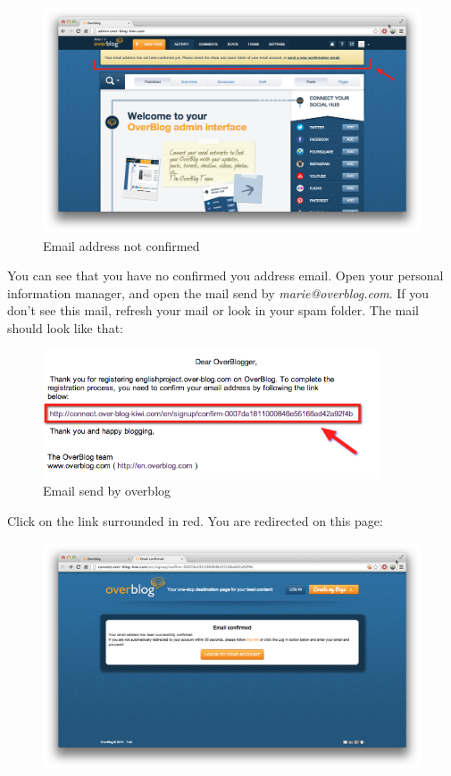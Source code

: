 \documentclass[a4paper,10pt]{article}
\begin{document}
\begin{enumerate}
\begin{figure}[H]
	\includegraphics[width=13cm]{Images/addressMailNotConfirmed.png}
    \caption{Email address not confirmed}
\end{figure}
You can see that you have no confirmed you address email. Open your personal information manager, and open the mail send by \emph{marie@overblog.com}. If you don't see this mail, refresh your mail or look in your spam folder. The mail should look like that:
\begin{figure}[H]
    \center
	\includegraphics[width=10cm]{Images/emailOverblog.png}
    \caption{Email send by overblog}
\end{figure}
Click on the link surrounded in red. You are redirected on this page:
\begin{figure}[H]
    \center
	\includegraphics[width=13cm]{Images/addressMailConfirmed.png}

\end{figure}
\end{enumerate}
\end{document}
